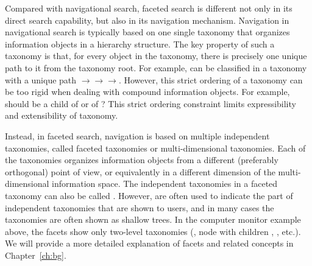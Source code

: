 Compared with navigational search, faceted search is different not only in its direct search capability, but also in its navigation mechanism. Navigation in navigational search is typically based on one single taxonomy that organizes information objects in a hierarchy structure. The key property of such a taxonomy is that, for every object in the taxonomy, there is precisely one unique path to it from the taxonomy root. For example,  can be classified in a taxonomy with a unique path  $\rightarrow$$\rightarrow$$\rightarrow$. However, this strict ordering of a taxonomy can be too rigid when dealing with compound information objects. For example, should  be a child of  or of ? This strict ordering constraint limits expressibility and extensibility of taxonomy. 

Instead, in faceted search, navigation is based on multiple independent taxonomies, called faceted taxonomies or multi-dimensional taxonomies. Each of the taxonomies organizes information objects from a different (preferably orthogonal) point of view, or equivalently in a different dimension of the multi-dimensional information space. The independent taxonomies in a faceted taxonomy can also be called . However,  are often used to indicate the part of independent taxonomies that are shown to users, and in many cases the taxonomies are often shown as shallow trees. In the computer monitor example above, the facets show only two-level taxonomies (\eg, node  with children , , etc.). We will provide a more detailed explanation of facets and related concepts in Chapter~\ref{ch:bg}.
 
